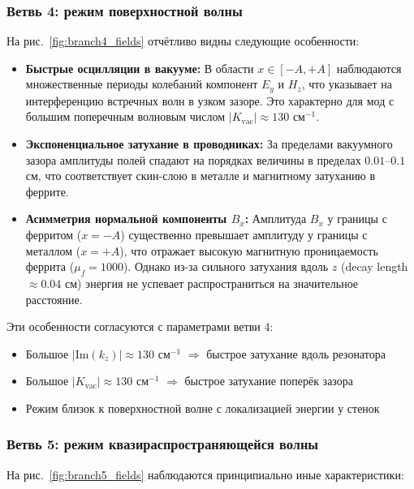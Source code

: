 \documentclass[a4paper,12pt]{article}
\begin{document}
\subsubsection{Ветвь 4: режим поверхностной волны}

На рис.~\ref{fig:branch4_fields} отчётливо видны следующие особенности:

\begin{itemize}
    \item \textbf{Быстрые осцилляции в вакууме:} В области $x \in [-A, +A]$
    наблюдаются множественные периоды колебаний компонент $E_y$ и $H_z$, что указывает
    на интерференцию встречных волн в узком зазоре. Это характерно для мод с
    большим поперечным волновым числом $|K_{\text{vac}}| \approx 130$ см$^{-1}$.

    \item \textbf{Экспоненциальное затухание в проводниках:} За пределами
    вакуумного зазора амплитуды полей спадают на порядках величины в пределах
    $0.01$--$0.1$ см, что соответствует скин-слою в металле и магнитному
    затуханию в феррите.

    \item \textbf{Асимметрия нормальной компоненты $B_x$:} Амплитуда $B_x$
    у границы с ферритом ($x = -A$) существенно превышает амплитуду у границы
    с металлом ($x = +A$), что отражает высокую магнитную проницаемость
    феррита ($\mu_f = 1000$). Однако из-за сильного затухания вдоль $z$
    (decay length $\approx 0.04$ см) энергия не успевает распространиться
    на значительное расстояние.
\end{itemize}

Эти особенности согласуются с параметрами ветви 4:
\begin{itemize}
    \item Большое $|\text{Im}(k_z)| \approx 130$ см$^{-1}$ $\Rightarrow$ быстрое
    затухание вдоль резонатора
    \item Большое $|K_{\text{vac}}| \approx 130$ см$^{-1}$ $\Rightarrow$ быстрое
    затухание поперёк зазора
    \item Режим близок к поверхностной волне с локализацией энергии у стенок
\end{itemize}

\subsubsection{Ветвь 5: режим квазираспространяющейся волны}

На рис.~\ref{fig:branch5_fields} наблюдаются принципиально иные характеристики:
\end{document}
